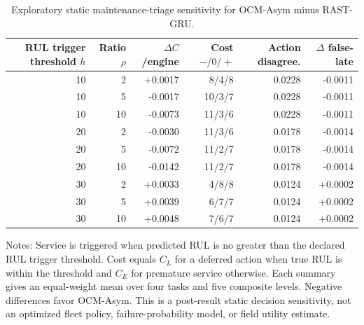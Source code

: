 \begin{table}[!t]
\centering
\caption{Exploratory static maintenance-triage sensitivity for OCM-Asym minus RAST-GRU.}
\label{tab:maintenance-decision}
\scriptsize
\setlength{\tabcolsep}{3.5pt}
\begin{tabular}{rrrrrr}
\toprule
RUL trigger threshold $h$ & Ratio $\rho$ & $\Delta C$/engine & Cost $-/0/+$ & Action disagree. & $\Delta$ false-late \\
\midrule
10 & 2 & +0.0017 & 8/4/8 & 0.0228 & -0.0011 \\
10 & 5 & -0.0017 & 10/3/7 & 0.0228 & -0.0011 \\
10 & 10 & -0.0073 & 11/3/6 & 0.0228 & -0.0011 \\
20 & 2 & -0.0030 & 11/3/6 & 0.0178 & -0.0014 \\
20 & 5 & -0.0072 & 11/2/7 & 0.0178 & -0.0014 \\
20 & 10 & -0.0142 & 11/2/7 & 0.0178 & -0.0014 \\
30 & 2 & +0.0033 & 4/8/8 & 0.0124 & +0.0002 \\
30 & 5 & +0.0039 & 6/7/7 & 0.0124 & +0.0002 \\
30 & 10 & +0.0048 & 7/6/7 & 0.0124 & +0.0002 \\
\bottomrule
\end{tabular}
\begin{minipage}{0.98\linewidth}\footnotesize Notes: Service is triggered when predicted RUL is no greater than the declared RUL trigger threshold. Cost equals $C_L$ for a deferred action when true RUL is within the threshold and $C_E$ for premature service otherwise. Each summary gives an equal-weight mean over four tasks and five composite levels. Negative differences favor OCM-Asym. This is a post-result static decision sensitivity, not an optimized fleet policy, failure-probability model, or field utility estimate.\end{minipage}
\end{table}
